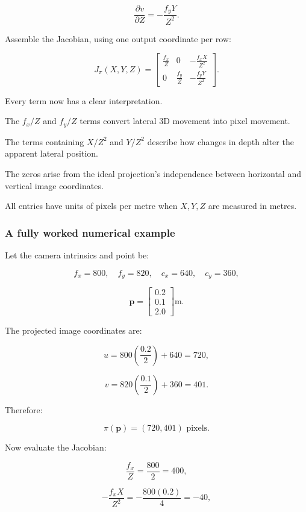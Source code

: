 \[
\frac{\partial v}{\partial Z}=-\frac{f_yY}{Z^2}.
\]

Assemble the Jacobian, using one output coordinate per row:

\[
\boxed{ J_\pi(X,Y,Z)= \begin{bmatrix} \frac{f_x}{Z}&0&-\frac{f_xX}{Z^2}\\[4pt] 0&\frac{f_y}{Z}&-\frac{f_yY}{Z^2} \end{bmatrix} }.
\]

Every term now has a clear interpretation.

The \(f_x/Z\) and \(f_y/Z\) terms convert lateral 3D movement into pixel movement.

The terms containing \(X/Z^2\) and \(Y/Z^2\) describe how changes in depth alter the apparent lateral position.

The zeros arise from the ideal projection's independence between horizontal and vertical image coordinates.

All entries have units of pixels per metre when \(X,Y,Z\) are measured in metres.

\subsubsection{A fully worked numerical example}\label{02-foundations-ii-ch021-a-fully-worked-numerical-example}

\hypertarget{02-foundations-ii-ch021-a-fully-worked-numerical-example}{}

Let the camera intrinsics and point be:

\[
f_x=800,\quad f_y=820, \quad c_x=640,\quad c_y=360,
\]

\[
\mathbf p= \begin{bmatrix} 0.2\\0.1\\2.0 \end{bmatrix}\mathrm{m}.
\]

The projected image coordinates are:

\[
u=800\left(\frac{0.2}{2}\right)+640=720,
\]

\[
v=820\left(\frac{0.1}{2}\right)+360=401.
\]

Therefore:

\[
\boxed{\pi(\mathbf p)=(720,401)\text{ pixels}}.
\]

Now evaluate the Jacobian:

\[
\frac{f_x}{Z}=\frac{800}{2}=400,
\]

\[
-\frac{f_xX}{Z^2} =-\frac{800(0.2)}{4}=-40,
\]

